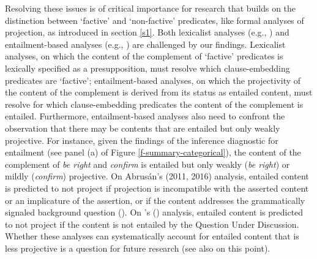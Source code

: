 \documentclass[11pt,fleqn]{article}
\newcommand{\6}{\mbox{$[\hspace*{-.6mm}[$}}
\newcommand{\9}{\mbox{$]\hspace*{-.6mm}]$}}
\newcommand{\citetpos}[1]{\citeauthor{#1}'s (\citeyear{#1})}
\begin{document}
{Resolving these issues is of critical importance for research that builds on the distinction between `factive' and `non-factive' predicates, like formal analyses of projection, as introduced in section \ref{s1}. Both lexicalist analyses (e.g., \citealt{heim83,vds92}) and entailment-based analyses (e.g., \citealt{abrusan2011,abrusan2016,romoli2015,best-question}) are challenged by our findings. Lexicalist analyses, on which the content of the complement of `factive' predicates is lexically specified as a presupposition, must resolve which clause-embedding predicates are `factive'; entailment-based analyses, on which the projectivity of the content of the complement is derived from its status as entailed content, must resolve for which clause-embedding predicates the content of the complement is entailed. Furthermore, entailment-based analyses also need to confront the observation that there may be contents that are entailed but only weakly projective. For instance, given the findings of the inference diagnostic for entailment (see panel (a) of Figure \ref{f-summary-categorical}), the content of the complement of {\em be right} and {\em confirm} is entailed but only weakly  ({\em be right}) or mildly ({\em confirm}) projective. On Abrus\'an's (2011, 2016) analysis, entailed content is predicted to not project if projection is incompatible with the asserted content or an implicature of the assertion, or if the content addresses the grammatically signaled background question (\citealt[511, 532]{abrusan2011}). On  \citetpos{best-question} analysis, entailed content is predicted to not project if the content is not entailed by the Question Under Discussion. Whether these analyses can systematically account for entailed content that is less projective is a question for future research (see also \citealt{tbd-variability} on this point).

}
\end{document}
